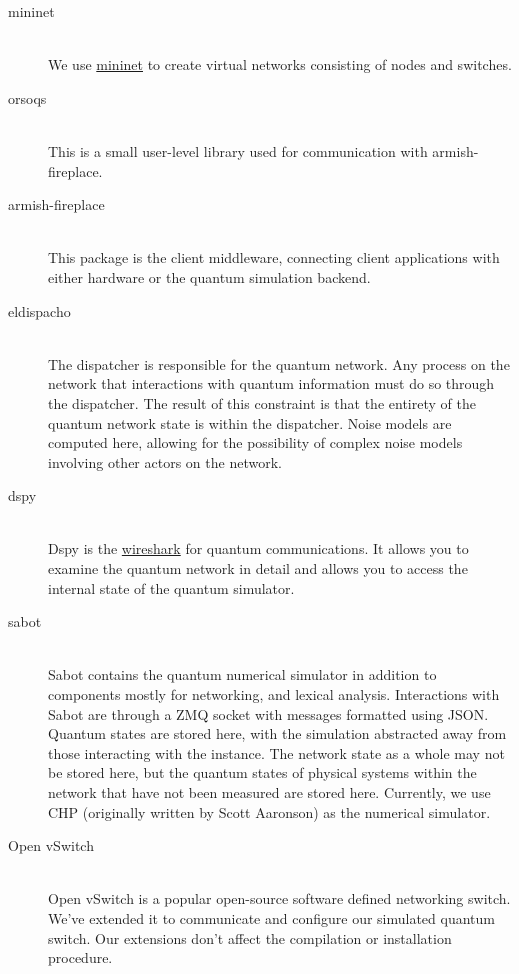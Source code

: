 \documentclass[letterpaper,twoside=false]{scrbook}
\begin{document}
	\begin{description}
		\item[mininet] \hfill \\
		We use \href{www.mininet.org}{mininet} to create virtual networks consisting of nodes and switches.
		
		\item[orsoqs] \hfill \\
		This is a small user-level library used for communication with armish-fireplace.
		
		\item[armish-fireplace] \hfill \\
		This package is the client middleware, connecting client applications with either hardware or the quantum simulation backend. 
		
		\item[eldispacho] \hfill \\
		The dispatcher is responsible for the quantum network. Any process on the network that interactions with quantum information must do so through the dispatcher. The result of this constraint is that the entirety of the quantum network state is within the dispatcher. Noise models are computed here, allowing for the possibility of complex noise models involving other actors on the network.
		
		\item[dspy] \hfill \\
		Dspy is the \href{www.wireshark.org}{wireshark} for quantum communications. It allows you to examine the quantum network in detail and allows you to access the internal state of the quantum simulator.
		
		\item[sabot] \hfill \\
		Sabot contains the quantum numerical simulator in addition to components mostly for networking, and lexical analysis. Interactions with Sabot are through a ZMQ socket with messages formatted using JSON. Quantum states are stored here, with the simulation abstracted away from those interacting with the instance. The network state as a whole may not be stored here, but the quantum states of physical systems within the network that have not been measured are stored here. Currently, we use CHP (originally written by Scott Aaronson) as the numerical simulator.
		
		\item[Open vSwitch] \hfill \\
		Open vSwitch is a popular open-source software defined networking switch. We've extended it to communicate and configure our simulated quantum switch. Our extensions don't affect the compilation or installation procedure.
		
	\end{description}
\end{document}
